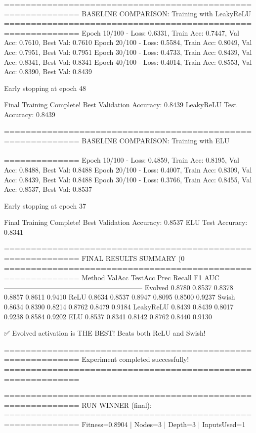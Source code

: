 ============================================================
BASELINE COMPARISON: Training with LeakyReLU
============================================================
Epoch  10/100 - Loss: 0.6331, Train Acc: 0.7447, Val Acc: 0.7610, Best Val: 0.7610
Epoch  20/100 - Loss: 0.5584, Train Acc: 0.8049, Val Acc: 0.7951, Best Val: 0.7951
Epoch  30/100 - Loss: 0.4733, Train Acc: 0.8439, Val Acc: 0.8341, Best Val: 0.8341
Epoch  40/100 - Loss: 0.4014, Train Acc: 0.8553, Val Acc: 0.8390, Best Val: 0.8439

Early stopping at epoch 48

Final Training Complete!
Best Validation Accuracy: 0.8439
LeakyReLU Test Accuracy: 0.8439

============================================================
BASELINE COMPARISON: Training with ELU
============================================================
Epoch  10/100 - Loss: 0.4859, Train Acc: 0.8195, Val Acc: 0.8488, Best Val: 0.8488
Epoch  20/100 - Loss: 0.4007, Train Acc: 0.8309, Val Acc: 0.8439, Best Val: 0.8488
Epoch  30/100 - Loss: 0.3766, Train Acc: 0.8455, Val Acc: 0.8537, Best Val: 0.8537

Early stopping at epoch 37

Final Training Complete!
Best Validation Accuracy: 0.8537
ELU Test Accuracy: 0.8341

============================================================
FINAL RESULTS SUMMARY (0%
============================================================
Method             ValAcc     TestAcc    Prec       Recall     F1         AUC
------------------------------------------------------------
Evolved            0.8780     0.8537     0.8378     0.8857     0.8611     0.9410
ReLU               0.8634     0.8537     0.8947     0.8095     0.8500     0.9237
Swish              0.8634     0.8390     0.8214     0.8762     0.8479     0.9184
LeakyReLU          0.8439     0.8439     0.8017     0.9238     0.8584     0.9202
ELU                0.8537     0.8341     0.8142     0.8762     0.8440     0.9130

✅ Evolved activation is THE BEST! Beats both ReLU and Swish!

============================================================
Experiment completed successfully!
============================================================

============================================================
RUN WINNER (final):
============================================================
Fitness=0.8904 | Nodes=3 | Depth=3 | InputsUsed=1


